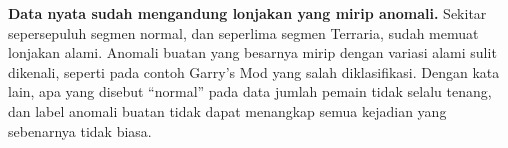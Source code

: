 \textbf{Data nyata sudah mengandung lonjakan yang mirip anomali.} Sekitar sepersepuluh segmen normal, dan seperlima segmen Terraria, sudah memuat lonjakan alami. Anomali buatan yang besarnya mirip dengan variasi alami sulit dikenali, seperti pada contoh Garry's Mod yang salah diklasifikasi. Dengan kata lain, apa yang disebut ``normal'' pada data jumlah pemain tidak selalu tenang, dan label anomali buatan tidak dapat menangkap semua kejadian yang sebenarnya tidak biasa.
